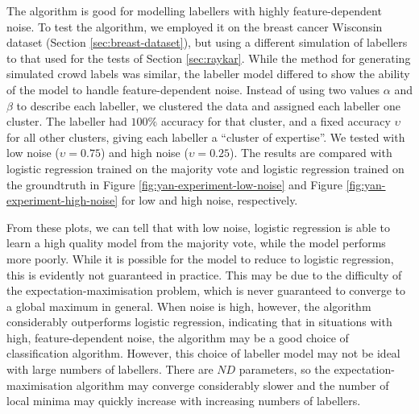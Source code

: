         The \citeauthor{yan10} algorithm is good for modelling labellers with
        highly feature-dependent noise. To test the algorithm, we employed it on
        the breast cancer Wisconsin dataset (Section \ref{sec:breast-dataset}),
        but using a different simulation of labellers to that used for the
        \citeauthor{raykar10} tests of Section \ref{sec:raykar}. While the
        method for generating simulated crowd labels was similar, the labeller
        model differed to show the ability of the \citeauthor{yan10} model to
        handle feature-dependent noise. Instead of using two values $\alpha$ and
        $\beta$ to describe each labeller, we clustered the data and assigned
        each labeller one cluster. The labeller had $100\%$ accuracy for that
        cluster, and a fixed accuracy $\upsilon$ for all other clusters, giving
        each labeller a ``cluster of expertise''. We tested with low noise
        ($\upsilon = 0.75$) and high noise ($\upsilon = 0.25$). The results are
        compared with logistic regression trained on the majority vote and
        logistic regression trained on the groundtruth in Figure
        \ref{fig:yan-experiment-low-noise} and Figure
        \ref{fig:yan-experiment-high-noise} for low and high noise,
        respectively.

        From these plots, we can tell that with low noise, logistic regression
        is able to learn a high quality model from the majority vote, while the
        \citeauthor{yan10} model performs more poorly. While it is possible for
        the \citeauthor{yan10} model to reduce to logistic regression, this is
        evidently not guaranteed in practice. This may be due to the difficulty
        of the expectation-maximisation problem, which is never guaranteed to
        converge to a global maximum in general. When noise is high, however,
        the \citeauthor{yan10} algorithm considerably outperforms logistic
        regression, indicating that in situations with high, feature-dependent
        noise, the \citeauthor{yan10} algorithm may be a good choice of
        classification algorithm. However, this choice of labeller model may not
        be ideal with large numbers of labellers. There are $ND$ parameters, so
        the expectation-maximisation algorithm may converge considerably slower
        and the number of local minima may quickly increase with increasing
        numbers of labellers.
